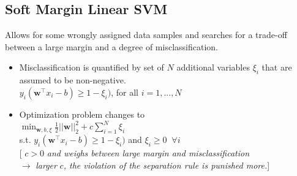 \documentclass[english]{latex4ei/latex4ei_sheet}
\begin{document}
\begin{sectionbox}
\subsection{Soft Margin Linear SVM}
Allows for some wrongly assigned data samples and searches for a trade-off between a large margin and a degree of misclassification.
\begin{itemize}
    \item Misclassification is quantified by set of $N$ additional variables $\xi_i$ that are assumed to be non-negative.\\
    $y_i(\mathbf{w}^{\top}x_i-b)\ge 1-\xi_i)$, for all $i=1,...,N$
    \item Optimization problem changes to\\
    $\min_{\mathbf{w},b,\xi}\frac{1}{2}||\mathbf{w}||_2^2+c\sum_{i=1}^N\xi_i$\\
    s.t. $y_i(\mathbf{w}^{\top}x_i-b)\ge 1-\xi_i)$ and $\xi_i\ge0\;\;\forall i$\\
    \hspace{5}[ $c>0$\emph{ and weighs between large margin and misclassification }\\$\rightarrow$\emph{ larger }$c$\emph{, the violation of the separation rule is punished more.}]
\end{itemize}
\end{sectionbox}

\vspace{100}
\end{document}
